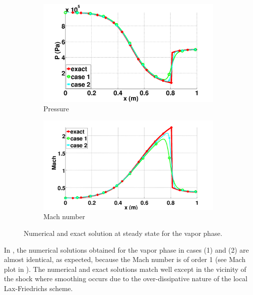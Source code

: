 \documentclass[preprint,10pt]{elsarticle}
\begin{document}
\begin{figure}[H]
        \begin{subfigure}[b]{0.495\textwidth}
                \centering
                \includegraphics[width=\textwidth]{figures/vapor_pressure_llf_and_exact_100.png}
                \caption{Pressure}
                \label{fig:vap-phase-press}
        \end{subfigure}        
        \begin{subfigure}[b]{0.495\textwidth}
                \centering
                \includegraphics[width=\textwidth]{figures/vapor_mach_llf_and_exact_100.png}
                \caption{Mach number}
                \label{fig:vap-phase-mach}
        \end{subfigure}
        \caption{Numerical and exact solution at steady state for the vapor phase.}\label{fig:vap-phase}
\end{figure}
%
In , the numerical solutions obtained for the vapor phase in cases (1) and (2) are almost identical, as expected, because the Mach number is of order 1
(see Mach plot in ). The numerical and exact solutions match  well except in the vicinity of the shock where smoothing occurs due to the over-dissipative nature of the local Lax-Friedrichs scheme. 
\end{document}
